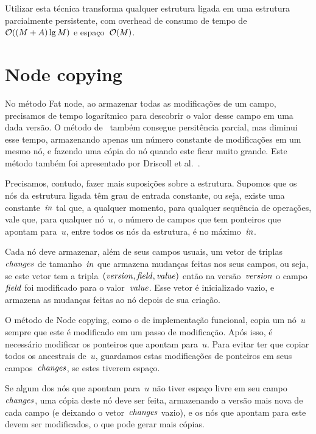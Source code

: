\documentclass[../../main.tex]{subfiles}
\begin{document}
Utilizar esta técnica transforma qualquer estrutura ligada em uma estrutura parcialmente persistente, com overhead de consumo de tempo de~$\mathcal{O}((M+A) \lg{M})$ e espaço~$\mathcal{O}(M)$.

\section{Node copying} \label{sec:nodecopying}

No método Fat node, ao armazenar todas as modificações de um campo, precisamos de tempo logarítmico para descobrir o valor desse campo em uma dada versão. O método de~ também consegue persitência parcial, mas diminui esse tempo, armazenando apenas um número constante de modificações em um mesmo nó, e fazendo uma cópia do nó quando este ficar muito grande. Este método também foi apresentado por Driscoll et al.~\cite{DriscollSST1989}.

Precisamos, contudo, fazer mais suposições sobre a estrutura. Supomos que os nós da estrutura ligada têm grau de entrada constante, ou seja, existe uma constante~$\mathit{in}$ tal que, a qualquer momento, para qualquer sequência de operações, vale que, para qualquer nó~$u$, o número de campos que tem ponteiros que apontam para~$u$, entre todos os nós da estrutura, é no máximo~$\mathit{in}$.

\newcommand{\changes}{\V{changes}}
\newcommand{\parents}{\V{parents}}
\newcommand{\ts}{\mathcal{T}}
\newcommand{\cp}{\V{copy}}
\newcommand{\version}{\V{version}}

Cada nó deve armazenar, além de seus campos usuais, um vetor de triplas~$\mathit{changes}$ de tamanho~$\mathit{in}$ que armazena mudanças feitas nos seus campos, ou seja, se este vetor tem a tripla~${(\mathit{version}, \mathit{field}, \mathit{value})}$ então na versão~$\mathit{version}$ o campo~$\mathit{field}$ foi modificado para o valor~$\mathit{value}$. Esse vetor é inicializado vazio, e armazena as mudanças feitas ao nó depois de sua criação.

O método de Node copying, como o de implementação funcional, copia um nó~$u$ sempre que este é modificado em um passo de modificação. Após isso, é necessário modificar os ponteiros que apontam para~$u$. Para evitar ter que copiar todos os ancestrais de~$u$, guardamos estas modificações de ponteiros em seus campos~$\changes$, se estes tiverem espaço.

Se algum dos nós que apontam para~$u$ não tiver espaço livre em seu campo~$\changes$, uma cópia deste nó deve ser feita, armazenando a versão mais nova de cada campo (e deixando o vetor~$\changes$ vazio), e os nós que apontam para este devem ser modificados, o que pode gerar mais cópias.
\end{document}
